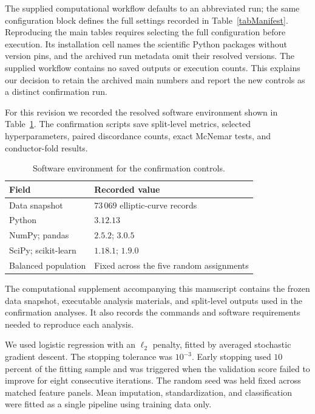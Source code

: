 \documentclass[12pt,reqno]{amsart}
\numberwithin{equation}{section}
\theoremstyle{plain}
\theoremstyle{definition}
\theoremstyle{remark}
\begin{document}
The supplied computational workflow defaults to an abbreviated run; the same configuration block defines the full settings recorded in Table~\ref{tabManifest}.
Reproducing the main tables requires selecting the full configuration before execution.
Its installation cell names the scientific Python packages without version pins, and the archived run metadata omit their resolved versions.
The supplied workflow contains no saved outputs or execution counts.
This explains our decision to retain the archived main numbers and report the new controls as a distinct confirmation run.

For this revision we recorded the resolved software environment shown in Table~\ref{tabConfirmationEnvironment}.
The confirmation scripts save split-level metrics, selected hyperparameters, paired discordance counts, exact McNemar tests, and conductor-fold results.

\begin{table}[H]
\centering
\caption{Software environment for the confirmation controls.}
\label{tabConfirmationEnvironment}
\begin{tabular}{ll}
\toprule
Field & Recorded value\\
\midrule
Data snapshot & $73\,069$ elliptic-curve records\\
Python & $3.12.13$\\
NumPy; pandas & $2.5.2$; $3.0.5$\\
SciPy; scikit-learn & $1.18.1$; $1.9.0$\\
Balanced population & Fixed across the five random assignments\\
\bottomrule
\end{tabular}
\end{table}

The computational supplement accompanying this manuscript contains the frozen data snapshot, executable analysis materials, and split-level outputs used in the confirmation analyses.
It also records the commands and software requirements needed to reproduce each analysis.

We used logistic regression with an $\ell_2$ penalty, fitted by averaged stochastic gradient descent. The stopping tolerance was $10^{-3}$.
Early stopping used $10$ percent of the fitting sample and was triggered when the validation score failed to improve for eight consecutive iterations.
The random seed was held fixed across matched feature panels.
Mean imputation, standardization, and classification were fitted as a single pipeline using training data only.
\end{document}

